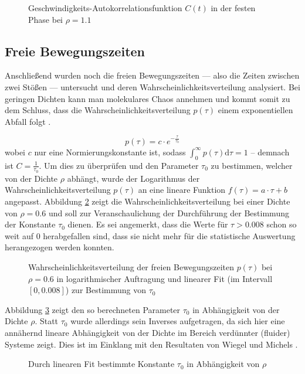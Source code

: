 \begin{figure}[H]
 \centering
  \resizebox{0.9\textwidth}{!}{}
 \caption{Geschwindigkeits-Autokorrelationsfunktion $C(t)$ in der festen Phase bei $\rho = 1.1$}
 \label{fig:autocorr-solid}
\end{figure} 
  

\subsection{Freie Bewegungszeiten}
Anschließend wurden noch die freien Bewegungszeiten --- also die Zeiten zwischen zwei Stößen --- untersucht und deren Wahrscheinlichkeitsverteilung analysiert. Bei geringen Dichten kann man molekulares Chaos annehmen und kommt somit zu dem Schluss, dass die Wahrscheinlichkeitsverteilung $p(\tau)$ einem exponentiellen Abfall folgt \cite{Wiegel1976}.

\begin{equation}
p(\tau) = c\cdot e^{-\frac{\tau}{\tau_0}}
\end{equation} 
wobei $c$ nur eine Normierungskonstante ist, sodass $\int_0^{\infty} p(\tau) \text{d}\tau = 1$ -- demnach ist $C = \frac{1}{\tau_0}$. Um dies zu überprüfen und den Parameter $\tau_0$ zu bestimmen, welcher von der Dichte $\rho$ abhängt, wurde der Logarithmus der Wahrscheinlichkeitsverteilung $p(\tau)$ an eine lineare Funktion $f(\tau) = a\cdot \tau + b$ angepasst. Abbildung \ref{fig:collisionfit} zeigt die Wahrscheinlichkeitsverteilung bei einer Dichte von $\rho = 0.6$ und soll zur Veranschaulichung der Durchführung der Bestimmung der Konstante $\tau_0$ dienen. Es sei angemerkt, dass die Werte für $\tau > 0.008$ schon so weit auf 0 herabgefallen sind, dass sie nicht mehr für die statistische Auswertung herangezogen werden konnten. 

\begin{figure}[H]
 \centering
  \resizebox{0.9\textwidth}{!}{}
 \caption{Wahrscheinlichkeitsverteilung der freien Bewegungszeiten $p(\tau)$ bei $\rho = 0.6$ in logarithmischer Auftragung und linearer Fit (im Intervall $[0,0.008]$) zur Bestimmung von $\tau_0$}
 \label{fig:collisionfit}
\end{figure} 
Abbildung \ref{fig:flight} zeigt den so berechneten Parameter $\tau_0$ in Abhängigkeit von der Dichte $\rho$. Statt $\tau_0$ wurde allerdings sein Inverses aufgetragen, da sich hier eine annähernd lineare Abhängigkeit von der Dichte im Bereich verdünnter (fluider) Systeme zeigt. Dies ist im Einklang mit den Resultaten von Wiegel und Michels \cite{Wiegel1979}. 

\begin{figure}[H]
 \centering
  \resizebox{0.9\textwidth}{!}{}
 \caption{Durch linearen Fit bestimmte Konstante $\tau_0$ in Abhängigkeit von $\rho$}
 \label{fig:flight}
\end{figure} 